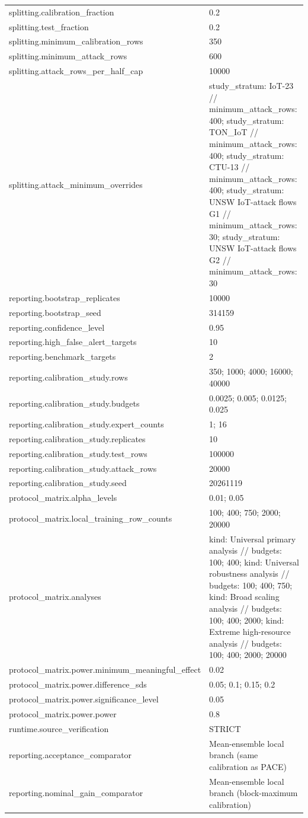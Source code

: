 \begin{tabular}{ll}
splitting.calibration\_fraction & 0.2 \\
splitting.test\_fraction & 0.2 \\
splitting.minimum\_calibration\_rows & 350 \\
splitting.minimum\_attack\_rows & 600 \\
splitting.attack\_rows\_per\_half\_cap & 10000 \\
splitting.attack\_minimum\_overrides & study\_stratum: IoT-23 // minimum\_attack\_rows: 400; study\_stratum: TON\_IoT // minimum\_attack\_rows: 400; study\_stratum: CTU-13 // minimum\_attack\_rows: 400; study\_stratum: UNSW IoT-attack flows G1 // minimum\_attack\_rows: 30; study\_stratum: UNSW IoT-attack flows G2 // minimum\_attack\_rows: 30 \\
reporting.bootstrap\_replicates & 10000 \\
reporting.bootstrap\_seed & 314159 \\
reporting.confidence\_level & 0.95 \\
reporting.high\_false\_alert\_targets & 10 \\
reporting.benchmark\_targets & 2 \\
reporting.calibration\_study.rows & 350; 1000; 4000; 16000; 40000 \\
reporting.calibration\_study.budgets & 0.0025; 0.005; 0.0125; 0.025 \\
reporting.calibration\_study.expert\_counts & 1; 16 \\
reporting.calibration\_study.replicates & 10 \\
reporting.calibration\_study.test\_rows & 100000 \\
reporting.calibration\_study.attack\_rows & 20000 \\
reporting.calibration\_study.seed & 20261119 \\
protocol\_matrix.alpha\_levels & 0.01; 0.05 \\
protocol\_matrix.local\_training\_row\_counts & 100; 400; 750; 2000; 20000 \\
protocol\_matrix.analyses & kind: Universal primary analysis // budgets: 100; 400; kind: Universal robustness analysis // budgets: 100; 400; 750; kind: Broad scaling analysis // budgets: 100; 400; 2000; kind: Extreme high-resource analysis // budgets: 100; 400; 2000; 20000 \\
protocol\_matrix.power.minimum\_meaningful\_effect & 0.02 \\
protocol\_matrix.power.difference\_sds & 0.05; 0.1; 0.15; 0.2 \\
protocol\_matrix.power.significance\_level & 0.05 \\
protocol\_matrix.power.power & 0.8 \\
runtime.source\_verification & STRICT \\
reporting.acceptance\_comparator & Mean-ensemble local branch (same calibration as PACE) \\
reporting.nominal\_gain\_comparator & Mean-ensemble local branch (block-maximum calibration) \\
\bottomrule
\end{tabular}
